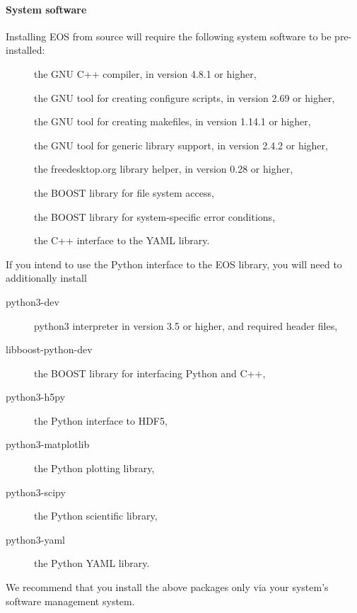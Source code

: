 \paragraph{System software} Installing EOS from source will require the following system
software to be pre-installed:
\begin{description}
    \item[] the GNU C++ compiler, in version 4.8.1 or higher,
    \item[] the GNU tool for creating configure scripts, in version 2.69 or higher,
    \item[] the GNU tool for creating makefiles, in version 1.14.1 or higher,
    \item[] the GNU tool for generic library support, in version 2.4.2 or higher,
    \item[] the freedesktop.org library helper, in version 0.28 or higher,
    \item[] the BOOST library for file system access,
    \item[] the BOOST library for system-specific error conditions,
    \item[] the C++ interface to the YAML library.
\end{description}
If you intend to use the Python \cite{Python} interface to the EOS library, you will need
to additionally install
\begin{description}
    \item[python3-dev] python3 interpreter in version 3.5 or higher, and required header files,
    \item[libboost-python-dev] the BOOST library for interfacing Python and C++,
    \item[python3-h5py] the Python interface to HDF5,
    \item[python3-matplotlib] the Python plotting library,
    \item[python3-scipy] the Python scientific library,
    \item[python3-yaml] the Python YAML library.
\end{description}
We recommend that you install the above packages only via your system's software management system.

